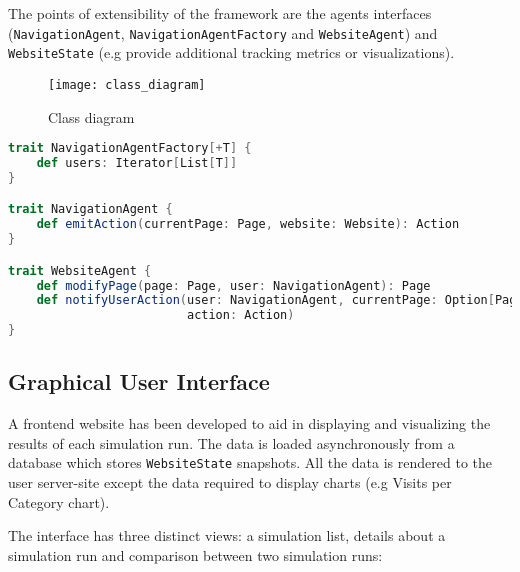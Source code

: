The points of extensibility of the framework are the agents interfaces 
(\texttt{NavigationAgent}, \texttt{NavigationAgentFactory} and 
\texttt{WebsiteAgent}) and \texttt{WebsiteState} (e.g provide additional 
tracking metrics or visualizations).

\begin{figure}[p]
    \begin{center}
        \leavevmode
        \texttt{[image: class\_diagram]}
        \caption{Class diagram}
        \label{fig:class}
    \end{center}
\end{figure}


\begin{lstlisting}[float,language=Scala, label=src:agentsinterfaces, 
caption=Definition of the agents interfaces]
trait NavigationAgentFactory[+T] {
    def users: Iterator[List[T]]
}

trait NavigationAgent {
    def emitAction(currentPage: Page, website: Website): Action
}

trait WebsiteAgent {
    def modifyPage(page: Page, user: NavigationAgent): Page
    def notifyUserAction(user: NavigationAgent, currentPage: Option[Page], 
                         action: Action)
}

\end{lstlisting}

\subsection{Graphical User Interface}

A frontend website has been developed to aid in displaying and visualizing the 
results of each simulation run. The data is loaded asynchronously from a 
database which stores \texttt{WebsiteState} snapshots. All the data is rendered 
to the user server-site except the data required to display charts (e.g Visits 
per Category chart).

The interface has three distinct views: a simulation list, details about a 
simulation run and comparison between two simulation runs:

